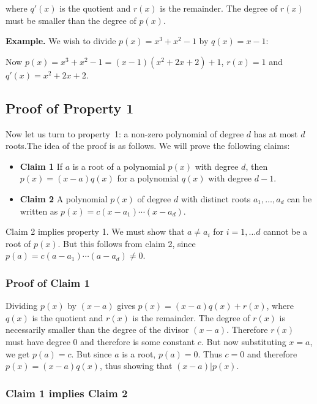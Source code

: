 \documentclass[11pt,fleqn]{article}
\begin{document}
where $q'(x)$ is the quotient and $r(x)$ is the remainder. The degree of $r(x)$ must
be smaller  than the degree of $p(x)$.

\textbf{Example.}
We wish to divide $p(x) = x^3 + x^2 - 1$ by $q(x) = x - 1$: 

 
 Now $p(x) = x^3 + x^2 - 1 = (x-1)(x^2 + 2x + 2) +  1$, $r(x) = 1$ and $q'(x) = x^2 + 2x + 2$. 
\subsection*{Proof of Property 1}

Now let us turn to property~1: a non-zero polynomial of degree $d$ has at most $d$
roots.The idea of the proof is as follows.
We will prove the following claims:
\begin{itemize}
\item[]{\bf Claim 1} If $a$ is a root of a polynomial $p(x)$ with degree $d$, 
then $p(x) = (x-a)q(x)$ for a polynomial $q(x)$ with degree $d-1$. 
\item[]{\bf Claim 2} A polynomial $p(x)$ of degree $d$ with distinct roots $a_1,\dots,a_d$ can be
written as $p(x) = c(x-a_1)\cdots(x-a_d)$. 
\end{itemize}
Claim 2 implies property 1. We must show that $a \neq a_i$ for $i = 1, \ldots d$ cannot be a root of $p(x)$.
But this follows from claim 2, since $p(a) = c(a-a_1)\cdots(a-a_d) \neq 0$. 

\subsubsection*{Proof of Claim 1}

Dividing $p(x)$ by $(x-a)$ gives
$p(x) = (x-a)q(x) + r(x)$, where $q(x)$ is the quotient and
$r(x)$ is the remainder. The degree of $r(x)$ is necessarily
smaller than the degree of the divisor $(x-a)$. Therefore
$r(x)$ must have degree $0$ and therefore is some constant $c$.
But now substituting $x=a$, we get $p(a) = c$. But since $a$ is
a root, $p(a) = 0$. Thus $c= 0$ and therefore $p(x) = (x-a)q(x)$,
thus showing that $(x-a)|p(x)$.

\subsubsection*{Claim 1 implies Claim 2}
\end{document}
